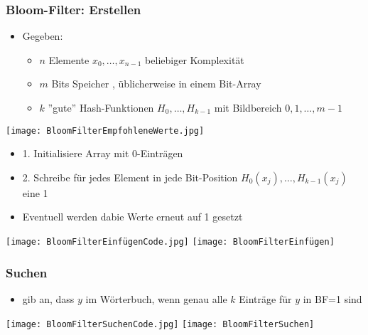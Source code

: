 		\subsubsection{Bloom-Filter: Erstellen}
			\begin{minipage}{0.65\textwidth}
				\begin{itemize}
					\item Gegeben:
						\begin{itemize}
							\item $n$ Elemente $x_0 , \dots , x_{n-1}$ beliebiger Komplexität
							\item $m$ Bits Speicher , üblicherweise in einem Bit-Array
							\item $k$ ''gute'' Hash-Funktionen $H_0 , \dots , H_{k-1}$ mit Bildbereich $0,1,\dots,m-1$
						\end{itemize}
				\end{itemize}				
			\end{minipage}
			\begin{minipage}{0.45\textwidth}
				\begin{center}
					\texttt{[image: BloomFilterEmpfohleneWerte.jpg]}
				\end{center}
			\end{minipage}
			\begin{itemize}
				\item 1. Initialisiere Array mit 0-Einträgen
				\item 2. Schreibe für jedes Element in jede Bit-Position 
					$H_0 (x_j),\dots, H_{k-1}(x_j)$ eine 1
					\item Eventuell werden dabie Werte erneut auf 1 gesetzt	
			\end{itemize}
					
			\begin{center}
				\texttt{[image: BloomFilterEinfügenCode.jpg]}
				\texttt{[image: BloomFilterEinfügen]}
			\end{center}

			
		\subsubsection{Suchen}
			\begin{itemize}
				\item gib an, dass $y$ im Wörterbuch, wenn genau alle $k$ Einträge für $y$ in BF=1 sind
			\end{itemize}

			\begin{center}
				\texttt{[image: BloomFilterSuchenCode.jpg]}
				\texttt{[image: BloomFilterSuchen]}
			\end{center}
			
